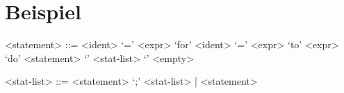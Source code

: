 \documentclass[./einleitung.tex]{subfiles}
\begin{document}
\section{Beispiel}
\setlength{\grammarparsep}{20pt plus 1pt minus 1pt} %
\setlength{\grammarindent}{12em} %

\begin{grammar}
<statement> ::= <ident> `=' <expr> 
\alt `for' <ident> `=' <expr> `to' <expr> `do' <statement> 
\alt `{' <stat-list> `}' 
\alt <empty> 

<stat-list> ::= <statement> `;' <stat-list> | <statement> 

\end{grammar}
\end{document}
